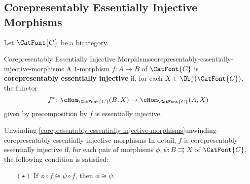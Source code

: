 \subsection{Corepresentably Essentially Injective Morphisms}\label{subsection-corepresentably-essentially-injective-morphisms}
Let $\CatFont{C}$ be a bicategory.
\begin{definition}{Corepresentably Essentially Injective Morphisms}{corepresentably-essentially-injective-morphisms}%
    A $1$-morphism $f\colon A\to B$ of $\CatFont{C}$ is \textbf{corepresentably essentially injective} if, for each $X\in\Obj(\CatFont{C})$, the functor
    \[
        f^{*}%
        \colon%
        \cHom_{\CatFont{C}}(B,X)%
        \to%
        \cHom_{\CatFont{C}}(A,X)%
    \]%
    given by precomposition by $f$ is essentially injective.
\end{definition}
\begin{remark}{Unwinding \cref{corepresentably-essentially-injective-morphisms}}{unwinding-corepresentably-essentially-injective-morphisms}%
    In detail, $f$ is corepresentably essentially injective if, for each pair of morphisms $\phi,\psi\colon B\rightrightarrows X$ of $\CatFont{C}$, the following condition is satisfied:
    \begin{itemize}%
        \item[$(\star)$]If $\phi\circ f\cong\psi\circ f$, then $\phi\cong\psi$.
    \end{itemize}%
\end{remark}
